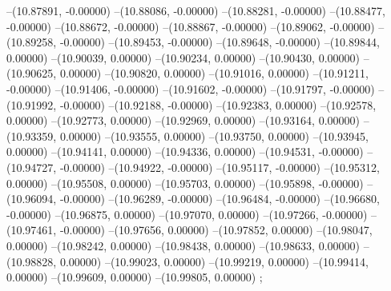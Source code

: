 --(10.87891, -0.00000)
--(10.88086, -0.00000)
--(10.88281, -0.00000)
--(10.88477, -0.00000)
--(10.88672, -0.00000)
--(10.88867, -0.00000)
--(10.89062, -0.00000)
--(10.89258, -0.00000)
--(10.89453, -0.00000)
--(10.89648, -0.00000)
--(10.89844, 0.00000)
--(10.90039, 0.00000)
--(10.90234, 0.00000)
--(10.90430, 0.00000)
--(10.90625, 0.00000)
--(10.90820, 0.00000)
--(10.91016, 0.00000)
--(10.91211, -0.00000)
--(10.91406, -0.00000)
--(10.91602, -0.00000)
--(10.91797, -0.00000)
--(10.91992, -0.00000)
--(10.92188, -0.00000)
--(10.92383, 0.00000)
--(10.92578, 0.00000)
--(10.92773, 0.00000)
--(10.92969, 0.00000)
--(10.93164, 0.00000)
--(10.93359, 0.00000)
--(10.93555, 0.00000)
--(10.93750, 0.00000)
--(10.93945, 0.00000)
--(10.94141, 0.00000)
--(10.94336, 0.00000)
--(10.94531, -0.00000)
--(10.94727, -0.00000)
--(10.94922, -0.00000)
--(10.95117, -0.00000)
--(10.95312, 0.00000)
--(10.95508, 0.00000)
--(10.95703, 0.00000)
--(10.95898, -0.00000)
--(10.96094, -0.00000)
--(10.96289, -0.00000)
--(10.96484, -0.00000)
--(10.96680, -0.00000)
--(10.96875, 0.00000)
--(10.97070, 0.00000)
--(10.97266, -0.00000)
--(10.97461, -0.00000)
--(10.97656, 0.00000)
--(10.97852, 0.00000)
--(10.98047, 0.00000)
--(10.98242, 0.00000)
--(10.98438, 0.00000)
--(10.98633, 0.00000)
--(10.98828, 0.00000)
--(10.99023, 0.00000)
--(10.99219, 0.00000)
--(10.99414, 0.00000)
--(10.99609, 0.00000)
--(10.99805, 0.00000)
;
